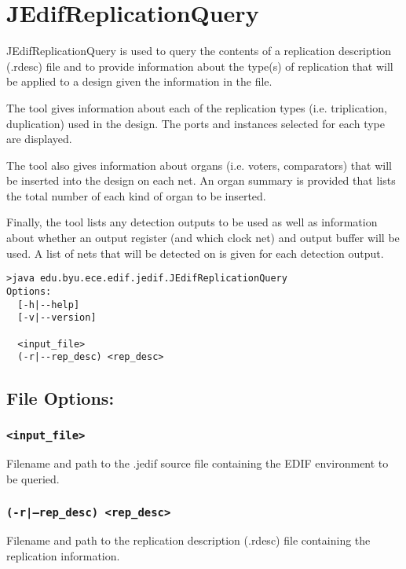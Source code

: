 \section{JEdifReplicationQuery}
JEdifReplicationQuery is used to query the contents of a replication
description (.rdesc) file and to provide information about the type(s) of
replication that will be applied to a design given the information in the file.

The tool gives information about each of the replication types (i.e.
triplication, duplication) used in the design. The ports and instances selected
for each type are displayed.

The tool also gives information about organs (i.e. voters, comparators) that
will be inserted into the design on each net. An organ summary is provided that
lists the total number of each kind of organ to be inserted.

Finally, the tool lists any detection outputs to be used as well as information
about whether an output register (and which clock net) and output buffer will
be used. A list of nets that will be detected on is given for each detection
output.

\begin{verbatim}
>java edu.byu.ece.edif.jedif.JEdifReplicationQuery
Options:
  [-h|--help]
  [-v|--version]

  <input_file>
  (-r|--rep_desc) <rep_desc>
\end{verbatim}

\subsection{File Options:}
\subsubsection{\texttt{<input\_file>}}
Filename and path to the .jedif source file containing the EDIF environment to
be queried.

\subsubsection{\texttt{(-r|--rep\_desc) <rep\_desc>}}
Filename and path to the replication description (.rdesc) file containing the
replication information.
